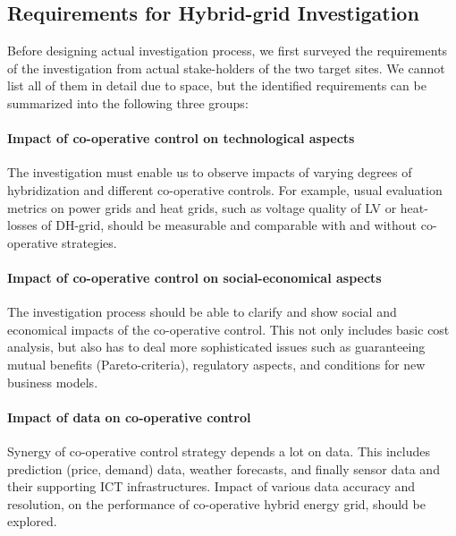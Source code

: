 \documentclass[conference]{IEEEtran}
\begin{document}
\subsection{Requirements for Hybrid-grid Investigation}
\label{sec:req-2}
Before designing actual investigation process, we first surveyed
the requirements of the investigation from actual stake-holders of the
two target sites. We cannot list all of them in detail due to space,
but the identified requirements can be summarized into the following
three groups:  

\paragraph{Impact of co-operative control on technological aspects}
The investigation  must enable us to observe impacts of
varying degrees of hybridization and different co-operative
controls. For example, usual evaluation metrics on power grids and
heat grids, such as voltage quality of LV or heat-losses of DH-grid, 
should be measurable and comparable with and without co-operative
strategies.   

\paragraph{Impact of co-operative control on social-economical aspects} 
The investigation process should be able to clarify and show social
and economical impacts of the co-operative control. This not only
includes basic cost analysis, but also has to deal more sophisticated 
issues such as guaranteeing mutual benefits (Pareto-criteria),
regulatory aspects, and conditions for new business models.  

\paragraph{Impact of data on co-operative control}
Synergy of co-operative control strategy depends a lot on data. 
This includes prediction (price, demand) data, weather
forecasts, and finally sensor data and their supporting ICT
infrastructures. Impact of various data accuracy and resolution, on
the performance of co-operative hybrid energy grid, should be 
explored. 
\end{document}
